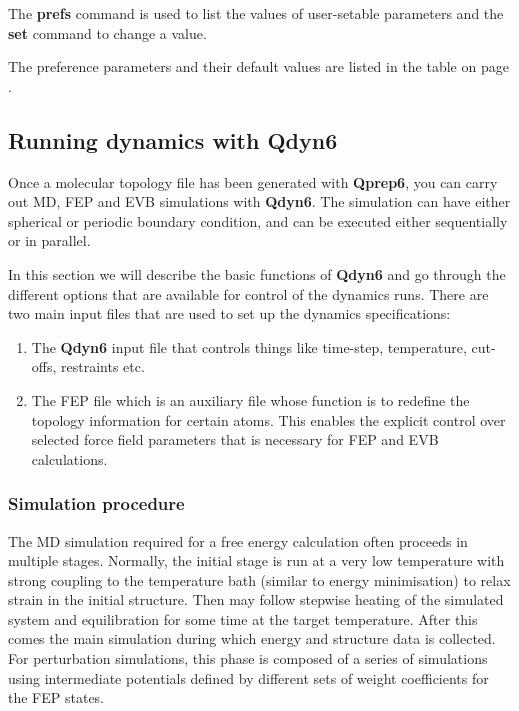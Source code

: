 \documentclass[a4paper,11pt]{article}
\begin{document}
The \textbf{prefs} command is used to list the values of
user-setable parameters and the \textbf{set} command to change a
value.

The preference parameters and their default values are listed in
the table on page \pageref{subsubsec:Qprep_preferences}.

\subsection{Running dynamics with \textbf{Qdyn6}}
Once a molecular topology file has been generated with \textbf{Qprep6}, you
can carry out MD, FEP and EVB simulations with \textbf{Qdyn6}. The
simulation can have either spherical or periodic boundary
condition, and can be executed either sequentially or in parallel.

In this section we will describe the basic functions of \textbf{Qdyn6} and
go through the different options that are available for control of
the dynamics runs. There are two main input files that are used to
set up the dynamics specifications:

\begin{enumerate}
\item The \textbf{Qdyn6} input file that controls things like time-step, temperature,
cut-offs, restraints etc.
\item The FEP file which is an auxiliary
file whose function is to redefine the topology information for
certain atoms. This enables the explicit control over selected
force field parameters that is necessary for FEP and EVB
calculations.
\end{enumerate}

\subsubsection{Simulation procedure}
The MD simulation required for a free energy calculation often
proceeds in multiple stages. Normally, the initial stage is run at
a very low temperature with strong coupling to the temperature
bath (similar to energy minimisation) to relax strain in the
initial structure. Then may follow stepwise heating of the
simulated system and equilibration for some time at the target
temperature. After this comes the main simulation during which
energy and structure data is collected. For perturbation
simulations, this phase is composed of a series of simulations
using intermediate potentials defined by different sets of weight
coefficients for the FEP states.
\end{document}
